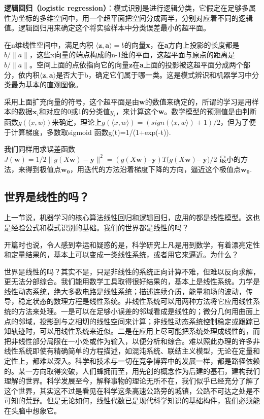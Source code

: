 \textbf{逻辑回归（logistic regression）}：模式识别是进行逻辑分类，它假定在足够多属性为坐标的多维空间中，用一个超平面把空间分成两半，分别对应着不同的逻辑值。逻辑回归用来确定这个将实验样本中分类误差最小的超平面。

在n维线性空间中，满足内积 $ \langle \bm{z}, \bm{a}\rangle = b $的向量\textbf{x}，在\textbf{a}方向上投影的长度都是$ b/\|a\| $，这些x向量的端点构成的n-1维的平面，这超平面与原点的距离是$ b/\|a\| $。空间上面的点依指向它的向量\textbf{z}在\textbf{a}上面的投影被这超平面分成两个部分，依内积$ \langle \bm{z}, \bm{a}\rangle  $是否大于b，确定它们属于哪一类。这是模式辨识和机器学习中分类最为基本的直观图像。

采用上面扩充向量的符号，这个超平面是由\textbf{w}的数值来确定的，所谓的学习是用样本的数据$ \bm{x}_i $和对应的0或1的分类值$ y_i $，来计算这个\textbf{w}。数学模型的预测值是由判断函数$ g(\langle x,w \rangle ) $来确定，理论上$ g(\langle x,w \rangle )= (sign(\langle x,w \rangle)+1)/2 $，但为了便于计算梯度，多数取sigmoid 函数g(t)=1/(1+exp(-t)).

我们同样用求误差函数$ J(\bm{w}) =1/2\|g(X\bm{w}) - \bm{y}\|^2 = (g( X\bm{w}) –\bm{y})T (g( X\bm{w}) –$   $\bm{y})/2 $ 最小的方法，来得到极值点$ \bm{w_0} $，用迭代的方法沿着梯度下降的方向，逼近这个极值点$ \bm{w_0} $.

\subsection{世界是线性的吗？}

上一节说，机器学习的核心算法线性回归和逻辑回归，应用的都是线性模型。这也是经验公式和模式识别的基础。我们的世界都是线性的吗？

开篇时也说，令人感到幸运和疑惑的是，科学研究上凡是用到数学，有着漂亮定性和定量结果的，基本上可以变成一类线性系统，或者用它来逼近。为什么？

世界是线性的吗？其实不是，只是非线性的系统正向计算不难，但难以反向求解，更无法分部综合。我们能用数学工具取得很好结果的，基本上是线性系统。力学是线性动态系统，绝大多数电路是线性系统；描述连续介质，能量和场的波动，传导，稳定状态的数理方程是线性系统。非线性系统可以用两种方法将它应用线性系统的方法来处理。一是可以在足够小误差的邻域看成是线性的；微分几何用曲面上点的邻域，投影到与之相切的线性空间来计算；非线性动态系统控制稳定或跟踪已知轨迹时，可以用线性系统来近似。二是在应用上尽可能把系统处理成线性的，而把非线性部分局限在一小处或作为输入，以便分析和综合。难以照此办理的许多非线性系统即使有精确简单的方程描述，如混沌系统、联结主义模型，无论在定量和定性上，都难以深入。科学和技术与一切在竞争博弈中的发展一样，都是路径依赖的。某一方向取得突破，人们蜂拥而至，用先创的概念作为后建的基石，建构我们理解的世界。科学发展至今，解释事物的理论无所不在，我们似乎已经充分了解了这个世界，其实这不过是看见在科学这条高速公路旁的城镇，公路不可达之处是不可知的荒野。但是无论如何，线性代数已是现代科学知识的基础构件，我们必须能在头脑中想象它。

